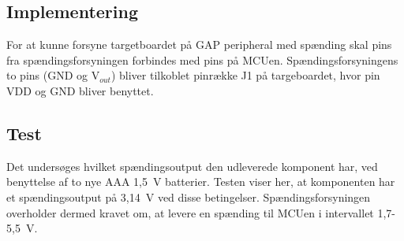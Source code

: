 \subsection{Implementering}
For at kunne forsyne targetboardet på GAP peripheral med spænding skal pins fra spændingsforsyningen forbindes med pins på MCUen. Spændingsforsyningens to pins (GND og V$_{out}$) bliver tilkoblet pinrække J1 på targeboardet, hvor pin VDD og GND bliver benyttet.

\subsection{Test} 
Det undersøges hvilket spændingsoutput den udleverede komponent har, ved benyttelse af to nye AAA 1,5~V batterier. Testen viser her, at komponenten har et spændingsoutput på 3,14~V ved disse betingelser.\newline
Spændingsforsyningen overholder dermed kravet om, at levere en spænding til MCUen i intervallet 1,7-5,5~V.




